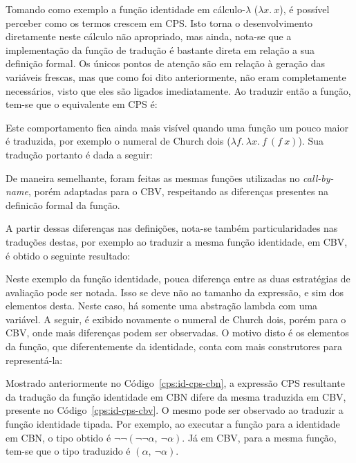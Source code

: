 Tomando como exemplo a função identidade em cálculo-$\lambda$ ($\lambda x.\ x$), é possível perceber como os termos crescem em CPS.
Isto torna o desenvolvimento diretamente neste cálculo não apropriado, mas ainda, nota-se que a implementação da função de tradução é bastante direta em relação a sua definição formal.
Os únicos pontos de atenção são em relação à geração das variáveis frescas, mas que como foi dito anteriormente, não eram completamente necessários, visto que eles são ligados imediatamente.
Ao traduzir então a função, tem-se que o equivalente em CPS é:

Este comportamento fica ainda mais visível quando uma função um pouco maior é traduzida, por exemplo o numeral de Church dois ($\lambda f.\ \lambda x.\ f\ (f\ x)$).
Sua tradução portanto é dada a seguir:

De maneira semelhante, foram feitas as mesmas funções utilizadas no \textit{call-by-name}, porém adaptadas para o CBV, respeitando as diferenças presentes na definicão formal da função.

A partir dessas diferenças nas definições, nota-se também particularidades nas traduções destas, por exemplo ao traduzir a mesma função identidade, em CBV, é obtido o seguinte resultado:

Neste exemplo da função identidade, pouca diferença entre as duas estratégias de avaliação pode ser notada.
Isso se deve não ao tamanho da expressão, e sim dos elementos desta.
Neste caso, há somente uma abstração lambda com uma variável.
A seguir, é exibido novamente o numeral de Church dois, porém para o CBV, onde mais diferenças podem ser observadas.
O motivo disto é os elementos da função, que diferentemente da identidade, conta com mais construtores para representá-la:


Mostrado anteriormente no Código~\ref{cps:id-cps-cbn}, a expressão CPS resultante da tradução da função identidade em CBN difere da mesma traduzida em CBV, presente no Código~\ref{cps:id-cps-cbv}.
O mesmo pode ser observado ao traduzir a função identidade tipada.
Por exemplo, ao executar a função para a identidade em CBN, o tipo obtido é $\neg\neg(\neg\neg\alpha,\ \neg\alpha)$.
Já em CBV, para a mesma função, tem-se que o tipo traduzido é $(\alpha,\ \neg\alpha)$.

